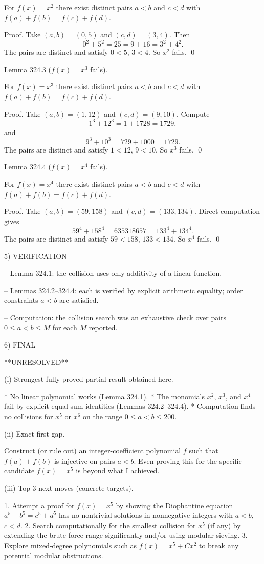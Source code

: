 For $f(x)=x^2$ there exist distinct pairs $a<b$ and $c<d$ with $f(a)+f(b)=f(c)+f(d)$.

Proof.
Take $(a,b)=(0,5)$ and $(c,d)=(3,4)$.
Then
\[
0^2+5^2=25=9+16=3^2+4^2.
\]
The pairs are distinct and satisfy $0<5$, $3<4$. So $x^2$ fails. \qed


Lemma 324.3 ($f(x)=x^3$ fails).

For $f(x)=x^3$ there exist distinct pairs $a<b$ and $c<d$ with $f(a)+f(b)=f(c)+f(d)$.

Proof.
Take $(a,b)=(1,12)$ and $(c,d)=(9,10)$.
Compute
\[
1^3+12^3 = 1+1728 = 1729,
\]
and
\[
9^3+10^3 = 729+1000 = 1729.
\]
The pairs are distinct and satisfy $1<12$, $9<10$. So $x^3$ fails. \qed


Lemma 324.4 ($f(x)=x^4$ fails).

For $f(x)=x^4$ there exist distinct pairs $a<b$ and $c<d$ with $f(a)+f(b)=f(c)+f(d)$.

Proof.
Take $(a,b)=(59,158)$ and $(c,d)=(133,134)$.
Direct computation gives
\[
59^4+158^4 = 635318657 = 133^4+134^4.
\]
The pairs are distinct and satisfy $59<158$, $133<134$. So $x^4$ fails. \qed


5) VERIFICATION

-- Lemma 324.1: the collision uses only additivity of a linear function.

-- Lemmas 324.2--324.4: each is verified by explicit arithmetic equality; order constraints $a<b$ are satisfied.

-- Computation: the collision search was an exhaustive check over pairs $0\le a<b\le M$ for each $M$ reported.


6) FINAL

**UNRESOLVED**

(i) Strongest fully proved partial result obtained here.

* No linear polynomial works (Lemma 324.1).
* The monomials $x^2$, $x^3$, and $x^4$ fail by explicit equal-sum identities (Lemmas 324.2--324.4).
* Computation finds no collisions for $x^5$ or $x^6$ on the range $0\le a<b\le 200$.

(ii) Exact first gap.

Construct (or rule out) an integer-coefficient polynomial $f$ such that $f(a)+f(b)$ is injective on pairs $a<b$.
Even proving this for the specific candidate $f(x)=x^5$ is beyond what I achieved.

(iii) Top 3 next moves (concrete targets).

1. Attempt a proof for $f(x)=x^5$ by showing the Diophantine equation $a^5+b^5=c^5+d^5$ has no nontrivial solutions in nonnegative integers with $a<b$, $c<d$.
2. Search computationally for the smallest collision for $x^5$ (if any) by extending the brute-force range significantly and/or using modular sieving.
3. Explore mixed-degree polynomials such as $f(x)=x^5+Cx^2$ to break any potential modular obstructions.

